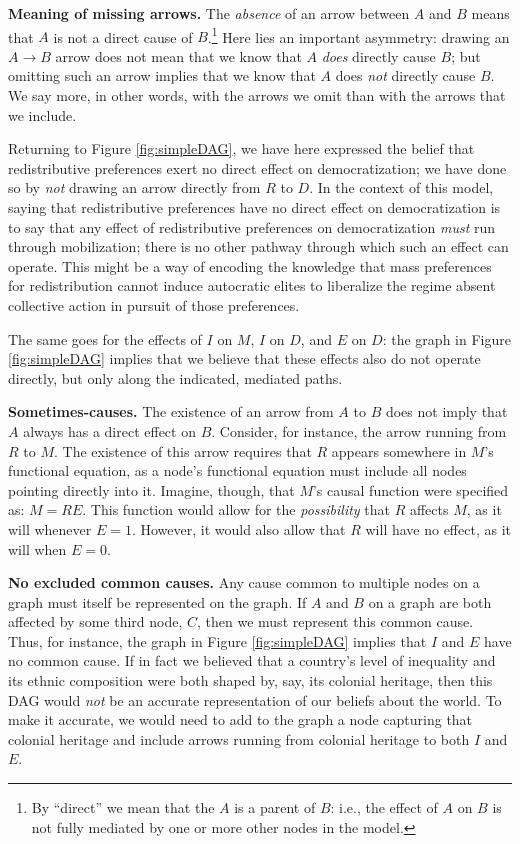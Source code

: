 \documentclass[
  12pt,
]{book}
\begin{document}
\textbf{Meaning of missing arrows.} The \emph{absence} of an arrow between \(A\) and \(B\) means that \(A\) is not a direct cause of \(B\).\footnote{By ``direct'' we mean that the \(A\) is a parent of \(B\): i.e., the effect of \(A\) on \(B\) is not fully mediated by one or more other nodes in the model.} Here lies an important asymmetry: drawing an \(A \rightarrow B\) arrow does not mean that we know that \(A\) \emph{does} directly cause \(B\); but omitting such an arrow implies that we know that \(A\) does \emph{not} directly cause \(B\). We say more, in other words, with the arrows we omit than with the arrows that we include.

Returning to Figure \ref{fig:simpleDAG}, we have here expressed the belief that redistributive preferences exert no direct effect on democratization; we have done so by \emph{not} drawing an arrow directly from \(R\) to \(D\). In the context of this model, saying that redistributive preferences have no direct effect on democratization is to say that any effect of redistributive preferences on democratization \emph{must} run through mobilization; there is no other pathway through which such an effect can operate. This might be a way of encoding the knowledge that mass preferences for redistribution cannot induce autocratic elites to liberalize the regime absent collective action in pursuit of those preferences.

The same goes for the effects of \(I\) on \(M\), \(I\) on \(D\), and \(E\) on \(D\): the graph in Figure \ref{fig:simpleDAG} implies that we believe that these effects also do not operate directly, but only along the indicated, mediated paths.

\textbf{Sometimes-causes.} The existence of an arrow from \(A\) to \(B\) does not imply that \(A\) always has a direct effect on \(B\). Consider, for instance, the arrow running from \(R\) to \(M\). The existence of this arrow requires that \(R\) appears somewhere in \(M\)'s functional equation, as a node's functional equation must include all nodes pointing directly into it. Imagine, though, that \(M\)'s causal function were specified as: \(M = RE\). This function would allow for the \emph{possibility} that \(R\) affects \(M\), as it will whenever \(E=1\). However, it would also allow that \(R\) will have no effect, as it will when \(E=0\).

\textbf{No excluded common causes.} Any cause common to multiple nodes on a graph must itself be represented on the graph. If \(A\) and \(B\) on a graph are both affected by some third node, \(C\), then we must represent this common cause. Thus, for instance, the graph in Figure \ref{fig:simpleDAG} implies that \(I\) and \(E\) have no common cause. If in fact we believed that a country's level of inequality and its ethnic composition were both shaped by, say, its colonial heritage, then this DAG would \emph{not} be an accurate representation of our beliefs about the world. To make it accurate, we would need to add to the graph a node capturing that colonial heritage and include arrows running from colonial heritage to both \(I\) and \(E\).
\end{document}
